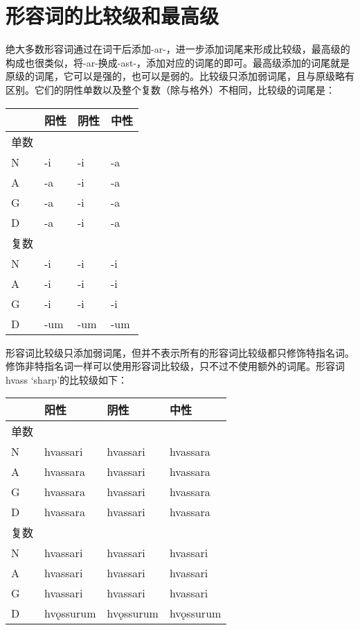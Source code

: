 \section{形容词的比较级和最高级}\label{形容词的比较级和最高级}

绝大多数形容词通过在词干后添加-ar-，进一步添加词尾来形成比较级，最高级的构成也很类似，将-ar-换成-ast-，添加对应的词尾的即可。最高级添加的词尾就是原级的词尾，它可以是强的，也可以是弱的。比较级只添加弱词尾，且与原级略有区别。它们的阴性单数以及整个复数（除与格外）不相同，比较级的词尾是：

\begin{longtable}{llll}
  \toprule
       & 阳性 & 阴性 & 中性 \\
  \midrule
  \endhead
  \bottomrule
  \endfoot
  单数 &      &      &      \\
  N    & -i   & -i   & -a   \\
  A    & -a   & -i   & -a   \\
  G    & -a   & -i   & -a   \\
  D    & -a   & -i   & -a   \\
  复数 &      &      &      \\
  N    & -i   & -i   & -i   \\
  A    & -i   & -i   & -i   \\
  G    & -i   & -i   & -i   \\
  D    & -um  & -um  & -um  \\
\end{longtable}

形容词比较级只添加弱词尾，但并不表示所有的形容词比较级都只修饰特指名词。修饰非特指名词一样可以使用形容词比较级，只不过不使用额外的词尾。形容词hvass
`sharp‌'的比较级如下：

\begin{longtable}{llll}
  \toprule
       & 阳性      & 阴性      & 中性      \\
  \midrule
  \endhead
  \bottomrule
  \endfoot
  单数 &           &           &           \\
  N    & hvassari  & hvassari  & hvassara  \\
  A    & hvassara  & hvassari  & hvassara  \\
  G    & hvassara  & hvassari  & hvassara  \\
  D    & hvassara  & hvassari  & hvassara  \\
  复数 &           &           &           \\
  N    & hvassari  & hvassari  & hvassari  \\
  A    & hvassari  & hvassari  & hvassari  \\
  G    & hvassari  & hvassari  & hvassari  \\
  D    & hvǫssurum & hvǫssurum & hvǫssurum \\
\end{longtable}

